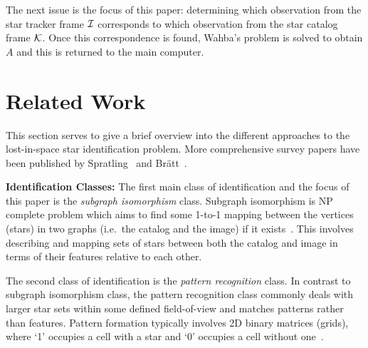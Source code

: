 \documentclass[conference]{IEEEtran}
\begin{document}
    The next issue is the focus of this paper: determining which observation from the star tracker frame $\mathcal{I}$
    corresponds to which observation from the star catalog frame $\mathcal{K}$.
    Once this correspondence is found, Wahba's problem is solved to obtain $A$ and this is returned to the main computer.

    \newcommand{\nsubparagraph}[1]{\textbf{#1}}

    \section{Related Work}\label{sec:relatedWork}
    This section serves to give a brief overview into the different approaches to the lost-in-space star identification
    problem.
    More comprehensive survey papers have been published by Spratling~\cite{spratling:surveyStarIdentification} and
    Br\"{a}tt~\cite{bratt:analysisStarIdentification}.

    \nsubparagraph{Identification Classes:}
    The first main class of identification and the focus of this paper is the \textit{subgraph isomorphism} class.
    Subgraph isomorphism is NP complete problem which aims to find some 1-to-1 mapping between the vertices (stars) in two
    graphs (i.e.\ the catalog and the image) if it exists~\cite{scott:graphIsomorphismProblem}.
    This involves describing and mapping sets of stars between both the catalog and image in terms of their features
    relative to each other.

    The second class of identification is the \textit{pattern recognition} class.
    In contrast to subgraph isomorphism class, the pattern recognition class commonly deals with larger star sets within
    some defined field-of-view and matches patterns rather than features.
    Pattern formation typically involves 2D binary matrices (grids), where `1' occupies a cell with a star and `0' occupies
    a cell without one~\cite{padgett:gridAlgorithm}.

\end{document}
